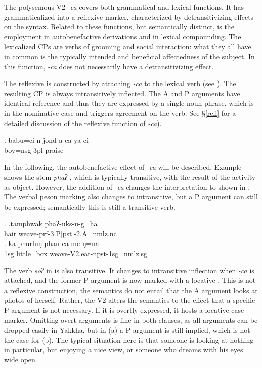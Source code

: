 The polysemous V2 \emph{-ca}  covers both grammatical and lexical functions. It has grammaticalized into a reflexive marker, characterized by detransitivizing effects on the syntax. Related to these functions, but semantically distinct, is the employment in autobenefactive derivations and in lexical compounding. The lexicalized CPs are verbs of  grooming and social interaction: what  they all have in common is the typically intended and beneficial affectedness of the subject. In this function, \emph{-ca} does not necessarily have a detransitivizing effect.
 
 The reflexive is constructed by attaching  \emph{-ca}  to the lexical verb (see \Next). The resulting CP is always intransitively inflected. The A and P arguments have identical reference and thus they are expressed by a single noun phrase, which is in the nominative case and triggers agreement on the verb. See §\ref{refl} for a detailed discussion of the reflexive function of \emph{-ca}). 
 
 \exg. babu=ci n-jond-a-ca-ya-ci\\
boy{\sc =nsg} {\sc 3pl}-praise-\\

In the following, the autobenefactive effect of \emph{-ca} will be described. Example \Next[a] shows the stem \emph{phaʔ} , which is typically transitive, with  the result of the activity as object. However, the addition of  \emph{-ca} changes the interpretation to  shown in \Next[b]. The verbal peson marking also changes to intransitive, but a P argument can still be expressed; semantically this is still a transitive verb.  

\ex. \ag.tamphwak phaʔ-uks-u-g=ha\\
		hair weave{\sc -prf-3.P[pst]-2.A=nmlz.nc} \\
\bg. ka phurluŋ phan-ca-me-ŋ=na\\
		{\sc 1sg} little\_box weave{\sc -V2.eat-npst-1sg=nmlz.sg} \\


The verb \emph{soʔ}  in \Next is also transitive. It changes to intransitive inflection when  \emph{-ca} is attached, and the former P argument is now marked with a locative \Next[b]. This is not a reflexive construction, the semantics do not entail that the A argument looks at photos of herself. Rather, the V2 alters the semantics to the effect that a specific P argument is not necessary. If it is overtly expressed, it hosts a locative case marker. Omitting overt arguments is fine in both clauses, as all arguments can be dropped easily in Yakkha, but in (a) a P argument is still implied, which is not the case for (b). The typical situation here is that someone is looking at nothing in particular, but enjoying a nice view, or someone who dreams with his eyes wide open.

